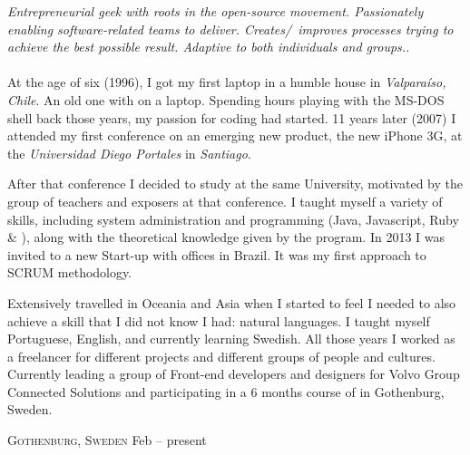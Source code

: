 \documentclass[10pt,a4paper]{article}
\begin{document}
\vspace{-1.3em}  %
\begin{multicols}{2}  %
\noindent \emph{Entrepreneurial geek with roots in the open-source movement. Passionately enabling software-related teams to deliver. Creates/\ improves processes trying to achieve the best possible result. Adaptive to both individuals and groups..}
\\
\\
At the age of six (1996), I got my first laptop in a humble house in \emph{Valparaíso, Chile}.  An old one with  on a  laptop. Spending hours playing with the MS-DOS shell back those years, my passion for coding had started. 11 years later (2007) I attended my first conference on an emerging new product, the new iPhone 3G, at the \emph{Universidad Diego Portales} in \emph{Santiago}.

After that conference I decided to study at the same University, motivated by the group of teachers and exposers at that conference. I taught myself a variety of skills, including system administration and programming (Java, Javascript, Ruby \& \CPP), along with the theoretical knowledge given by the program. In 2013 I was invited to a new Start-up with offices in Brazil. It was my first approach to SCRUM methodology.

Extensively travelled in Oceania and Asia when I started to feel I needed to also achieve a skill that I did not know I had: natural languages. I taught myself Portuguese, English, and currently learning Swedish. All those years I  worked as a freelancer for different projects and different groups of people and cultures. Currently leading a group of Front-end developers and designers for Volvo Group Connected Solutions and participating in a 6 months course of {\href{https://www.globalleadership.com/en/}{}} in Gothenburg, Sweden.



\end{multicols}


\spacedhrule{0em}{-0.4em}


\headedsection
  {\href{https://www.volvogroup.com/en/about-us/organization/other-entities/volvo-group-connected-solutions.html}{}}
  {\textsc{Gothenburg, Sweden}} {%
  \headedsubsection
    {  }
    {Feb  -- present}
    {}
}
\end{document}

